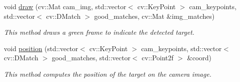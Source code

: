 \begin{DoxyCompactItemize}
void \hyperlink{classTarget_aeded1864a766c08b65c920974d7f4a6c}{draw} (cv\+::\+Mat cam\+\_\+img, std\+::vector$<$ cv\+::\+Key\+Point $>$ cam\+\_\+keypoints, std\+::vector$<$ cv\+::\+D\+Match $>$ good\+\_\+matches, cv\+::\+Mat \&img\+\_\+matches)
\begin{DoxyCompactList}\small\item\em This method draws a green frame to indicate the detected target. \end{DoxyCompactList}\item 
\mbox{\label{classTarget_aa83d54e883a7b8cc0ebf09ea612e335a}} 
void \hyperlink{classTarget_aa83d54e883a7b8cc0ebf09ea612e335a}{position} (std\+::vector$<$ cv\+::\+Key\+Point $>$ cam\+\_\+keypoints, std\+::vector$<$ cv\+::\+D\+Match $>$ good\+\_\+matches, std\+::vector$<$ cv\+::\+Point2f $>$ \&coord)
\begin{DoxyCompactList}\small\item\em This method computes the position of the target on the camera image. \end{DoxyCompactList}\end{DoxyCompactItemize}
